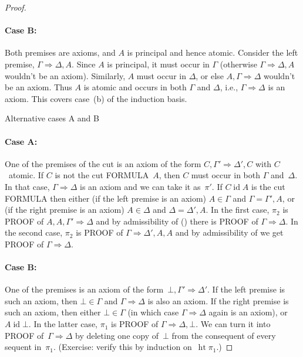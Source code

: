 \documentclass[10pt,a4paper]{article}
\makeatletter
\newcommand*{\olup}[1]{\MakeUppercase{#1}}
\theoremstyle{plain}
\theoremstyle{definition}
\theoremstyle{remark}
\newcommand{\olref}{\@ifnextchar[{\olref@i}{\olref@final}}
\def\olref@i[#1]{\@ifnextchar[{\olref@ii}{\olref@final}}
\def\olref@ii[#1]{\@ifnextchar[{\olref@iii}{\olref@final}}
\def\olref@iii[#1]{\olref@final}
\def\olref@final#1{\ref{#1}}
\providecommand{\lfalse}{\bot}
\providecommand{\Sequent}{\mathrel{\Rightarrow}}
\providecommand{\LeftR}[1]{}
\providecommand{\RightR}[1]{}
\providecommand{\pheight}{\operatorname{ht}}
\providecommand{\RightR}{\mathrm{R}}
\providecommand{\LeftR}{\mathrm{L}}
\providecommand{\ident}{\operatorname{id}}
\providecommand{\Contraction}{\mathrm{C}}
\makeatother
\begin{document}
\begin{proof}
\paragraph{Case B:} Both premises are axioms, and $A$ is principal
and hence atomic. Consider the left premise, $\Gamma \Sequent
\Delta, A$. Since $A$ is principal, it must occur in $\Gamma$
(otherwise $\Gamma \Sequent \Delta, A$ wouldn't be an axiom). Similarly,
$A$ must occur in $\Delta$, or else $A, \Gamma \Sequent \Delta$
wouldn't be an axiom. Thus $A$ is atomic and occurs in both $\Gamma$
and $\Delta$, i.e., $\Gamma \Sequent \Delta$ is an axiom. This covers
case~(b) of the induction basis.

\begin{center}
Alternative cases A and B
\end{center}

\paragraph{Case A:} One of the premises of the cut is an axiom of the
form $C, \Gamma' \Sequent \Delta', C$ with $C$~atomic. If $C$ is
not the cut \olup{formula}~$A$, then $C$ must occur in both $\Gamma$
and~$\Delta$. In that case, $\Gamma \Sequent \Delta$ is an axiom and
we can take it as~$\pi'$. If $C \ident A$ is the cut \olup{formula}
then either (if the left premise is an axiom) $A \in \Gamma$ and
$\Gamma = \Gamma', A$, or (if the right premise is an axiom) $A \in
\Delta$ and $\Delta = \Delta', A$. In the first case, $\pi_2$ is
\olup{proof} of $A, A, \Gamma' \Sequent \Delta$ and by admissibility
of \LeftR{\Contraction} (\olref[seq][inv]{prop:G3c-cont-adm}) there is
\olup{proof} of $\Gamma \Sequent \Delta$. In the second case, $\pi_2$ is
\olup{proof} of $\Gamma \Sequent \Delta', A, A$ and by admissibility
of \RightR{\Contraction} we get \olup{proof} of $\Gamma \Sequent
\Delta$.

\paragraph{Case B:} One of the premises is an axiom of the
form~$\lfalse, \Gamma' \Sequent \Delta'$. If the left premise is such
an axiom, then $\lfalse \in \Gamma$ and $\Gamma \Sequent \Delta$ is
also an axiom. If the right premise is such an axiom, then either
$\lfalse \in \Gamma$ (in which case $\Gamma \Sequent \Delta$ again is
an axiom), or $A \ident \lfalse$. In the latter case, $\pi_1$ is
\olup{proof} of $\Gamma \Sequent \Delta, \lfalse$. We can turn it into
\olup{proof} of~$\Gamma \Sequent \Delta$ by deleting one copy
of~$\lfalse$ from the consequent of every sequent in~$\pi_1$.
(Exercise: verify this by induction on~$\pheight{\pi_1}$.)


\end{proof}
\end{document}

